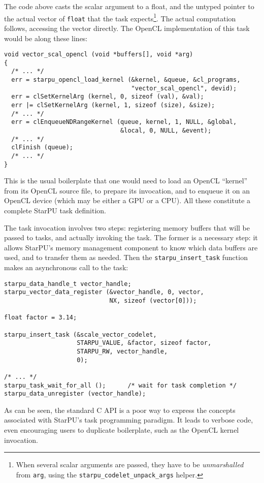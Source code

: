 \documentclass[twoside, a4paper, 10pt]{article}
\begin{document}
The code above casts the scalar argument to a float, and the untyped pointer
to the actual vector of \texttt{float} that the task expects\footnote{When several scalar arguments are passed, they have to be
  \emph{unmarshalled} from \texttt{arg}, using the \texttt{starpu\_codelet\_unpack\_args}
  helper.
 }.  The actual
computation follows, accessing the vector directly.  The OpenCL
implementation of this task would be along these lines:


\begin{verbatim}
void vector_scal_opencl (void *buffers[], void *arg)
{
  /* ... */
  err = starpu_opencl_load_kernel (&kernel, &queue, &cl_programs,
                                   "vector_scal_opencl", devid);
  err = clSetKernelArg (kernel, 0, sizeof (val), &val);
  err |= clSetKernelArg (kernel, 1, sizeof (size), &size);
  /* ... */
  err = clEnqueueNDRangeKernel (queue, kernel, 1, NULL, &global,
                                &local, 0, NULL, &event);
  /* ... */
  clFinish (queue);
  /* ... */
}
\end{verbatim}

This is the usual boilerplate that one would need to load an OpenCL
``kernel'' from its OpenCL source file, to prepare its invocation, and to
enqueue it on an OpenCL device (which may be either a GPU or a CPU).
All these constitute a complete StarPU task definition.

The task invocation involves two steps: registering memory buffers that
will be passed to tasks, and actually invoking the task.  The former is
a necessary step: it allows StarPU's memory management component to know
which data buffers are used, and to transfer them as needed.  Then the
\texttt{starpu\_insert\_task} function makes an asynchronous call to the task:


\begin{verbatim}
starpu_data_handle_t vector_handle;
starpu_vector_data_register (&vector_handle, 0, vector,
                             NX, sizeof (vector[0]));

float factor = 3.14;

starpu_insert_task (&scale_vector_codelet,
                    STARPU_VALUE, &factor, sizeof factor,
                    STARPU_RW, vector_handle,
                    0);

/* ... */
starpu_task_wait_for_all ();      /* wait for task completion */
starpu_data_unregister (vector_handle);
\end{verbatim}

As can be seen, the standard C API is a poor way to express the concepts
associated with StarPU's task programming paradigm.  It leads to verbose
code, even encouraging users to duplicate boilerplate, such
as the OpenCL kernel invocation.
\end{document}
